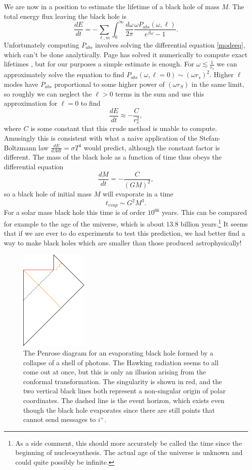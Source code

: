 \documentclass[12pt]{article}
\newcommand{\be}{\begin{equation}}
\newcommand{\ee}{\end{equation}}
\begin{document}
We are now in a position to estimate the lifetime of a black hole of mass $M$.  The total energy flux leaving the black hole is
\be
\frac{dE}{dt}=-\sum_{\ell,m}\int_0^\infty \frac{d\omega}{2\pi}\frac{\omega P_{\mathit{abs}}(\omega,\ell)}{e^{\beta \omega}-1}.
\ee   
Unfortunately computing $P_{\mathit{abs}}$ involves solving the differential equation \eqref{modeeq}, which can't be done analytically.  Page has solved it numerically to compute exact lifetimes \cite{Page:1976df}, but for our purposes a simple estimate is enough.  For $\omega \lesssim \frac{1}{r_s}$ we can approximately solve the equation to find $P_{\mathit{abs}}(\omega,\ell=0)\sim (\omega r_s)^2$.  Higher $\ell$ modes have $P_{\mathit{abs}}$ proportional to some higher power of $(\omega r_S)$ in the same limit, so roughly we can neglect the $\ell>0$ terms in the sum and use this approximation for $\ell=0$ to find
\be
\frac{dE}{dt}\approx -\frac{C}{r_s^2},
\ee
where $C$ is some constant that this crude method is unable to compute.  Amusingly this is consistent with what a naive application of the Stefan-Boltzmann law $\frac{dE}{dA dt}=\sigma T^4$ would predict, although the constant factor is different.  The mass of the black hole as a function of time thus obeys the differential equation
\be
\frac{dM}{dt}=-\frac{C}{(GM)^2},
\ee
so a black hole of initial mass $M$ will evaporate in a time
\be
t_{\mathit{evap}}\sim G^2 M^3.
\ee
For a solar mass black hole this time is of order $10^{66}$ years.  This can be compared for example to the age of the universe, which is about $13.8$ billion years.\footnote{As a side comment, this should more accurately be called the time since the beginning of nucleosynthesis.  The actual age of the universe is unknown and could quite possibly be infinite.}  It seems that if we are ever to do experiments to test this prediction, we had better find a way to make black holes which are smaller than those produced astrophysically!
\begin{figure}
\begin{center}
\includegraphics[height=5cm]{evappen.pdf}
\caption{The Penrose diagram for an evaporating black hole formed by a collapse of a shell of photons.  The Hawking radiation seems to all come out at once, but this is only an illusion arising from the conformal transformation.  The singularity is shown in red, and the two vertical black lines both represent a non-singular origin of polar coordinates.  The dashed line is the event horizon, which exists even though the black hole evaporates since there are still points that cannot send messages to $i^+$.}\label{evappen}
\end{center}
\end{figure}
\end{document}
